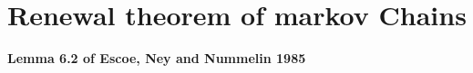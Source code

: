 \documentclass[12pt]{article}
\begin{document}
\section{Renewal theorem of markov Chains}
{\bf Lemma 6.2 of Escoe, Ney and Nummelin 1985}


\end{document}
